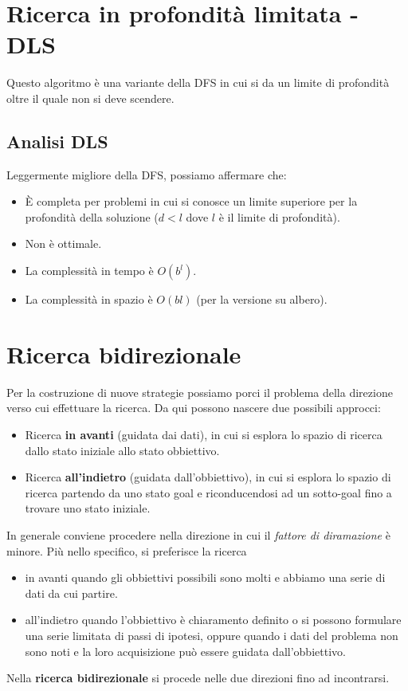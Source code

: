 \section{Ricerca in profondit\`a limitata - DLS}
Questo algoritmo \`e una variante della DFS in cui si da un limite di profondit\`a oltre
il quale non si deve scendere.

\subsection{Analisi DLS}
Leggermente migliore della DFS, possiamo affermare che:
\begin{itemize}
	\item \`E completa per problemi in cui si conosce un limite superiore per la profondit\`a
	      della soluzione ($d < l$ dove $l$ \`e il limite di profondit\`a).
	\item Non \`e ottimale.
	\item La complessit\`a in tempo \`e $O(b^l)$.
	\item La complessit\`a in spazio \`e $O(bl)$ (per la versione su albero).
\end{itemize}

\section{Ricerca bidirezionale}
Per la costruzione di nuove strategie possiamo porci il problema della direzione verso cui
effettuare la ricerca.
Da qui possono nascere due possibili approcci:
\begin{itemize}
	\item Ricerca \textbf{in avanti} (guidata dai dati), in cui si esplora lo spazio di
	      ricerca dallo stato iniziale allo stato obbiettivo.
	\item Ricerca \textbf{all'indietro} (guidata dall'obbiettivo), in cui si esplora lo
	      spazio di ricerca partendo da uno stato goal e riconducendosi ad un sotto-goal
	      fino a trovare uno stato iniziale.
\end{itemize}
In generale conviene procedere nella direzione in cui il \emph{fattore di diramazione}
\`e minore.
Pi\`u nello specifico, si preferisce la ricerca
\begin{itemize}
	\item in avanti quando gli obbiettivi possibili sono molti e abbiamo una serie di dati
	      da cui partire.
	\item all'indietro quando l'obbiettivo \`e chiaramento definito o si possono formulare
	      una serie limitata di passi di ipotesi, oppure quando i dati del problema non
	      sono noti e la loro acquisizione pu\`o essere guidata dall'obbiettivo.
\end{itemize}
Nella \textbf{ricerca bidirezionale} si procede nelle due direzioni fino ad incontrarsi.

